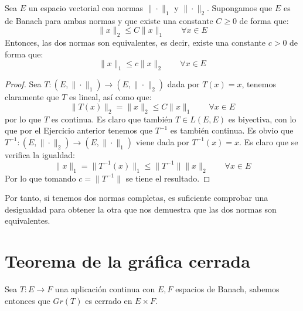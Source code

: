\begin{coro}\label{coro:equivalencia_normas}
    Sea $E$ un espacio vectorial con normas $\|\cdot \|_1$ y $\|\cdot \|_2$. Supongamos que $E$ es de Banach para ambas normas y que existe una constante $C\geq 0$ de forma que:
    \begin{equation*}
        \|x\|_2 \leq C\|x\|_1 \qquad \forall x\in E
    \end{equation*}
    Entonces, las dos normas son equivalentes, es decir, existe una constante $c>0$ de forma que:
    \begin{equation*}
        \|x\|_1 \leq c\|x\|_2 \qquad \forall x\in E
    \end{equation*}
    \begin{proof}
        Sea $T:(E,\|\cdot \|_1)\to (E,\|\cdot \|_2)$ dada por $T(x) = x$, tenemos claramente que $T$ es lineal, así como que:
        \begin{equation*}
            \|T(x)\|_2 = \|x\|_2 \leq C\|x\|_1 \qquad \forall x\in E
        \end{equation*}
        por lo que $T$ es continua. Es claro que también $T\in L(E,E)$ es biyectiva, con lo que por el Ejercicio anterior tenemos que $T^{-1}$ es también continua. Es obvio que $T^{-1}:(E,\|\cdot \|_2)\to (E,\|\cdot \|_1)$ viene dada por $T^{-1}(x) = x$. Es claro que se verifica la igualdad:
        \begin{equation*}
            \|x\|_1 = \|T^{-1}(x)\|_1 \leq \|T^{-1}\|\|x\|_2 \qquad \forall x\in E
        \end{equation*}
        Por lo que tomando $c = \|T^{-1}\|$ se tiene el resultado.
    \end{proof}
\end{coro}

\noindent
Por tanto, si tenemos dos normas completas, es suficiente comprobar una desigualdad para obtener la otra que nos demuestra que las dos normas son equivalentes. 

\section{Teorema de la gráfica cerrada}
\noindent
Sea $T:E\to F$ una aplicación continua con $E,F$ espacios de Banach, sabemos entonces que $Gr(T)$ es cerrado en $E\times F$. %

